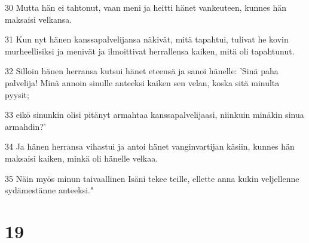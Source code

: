 \par 30 Mutta hän ei tahtonut, vaan meni ja heitti hänet vankeuteen, kunnes hän maksaisi velkansa.
\par 31 Kun nyt hänen kanssapalvelijansa näkivät, mitä tapahtui, tulivat he kovin murheellisiksi ja menivät ja ilmoittivat herrallensa kaiken, mitä oli tapahtunut.
\par 32 Silloin hänen herransa kutsui hänet eteensä ja sanoi hänelle: 'Sinä paha palvelija! Minä annoin sinulle anteeksi kaiken sen velan, koska sitä minulta pyysit;
\par 33 eikö sinunkin olisi pitänyt armahtaa kanssapalvelijaasi, niinkuin minäkin sinua armahdin?'
\par 34 Ja hänen herransa vihastui ja antoi hänet vanginvartijan käsiin, kunnes hän maksaisi kaiken, minkä oli hänelle velkaa.
\par 35 Näin myös minun taivaallinen Isäni tekee teille, ellette anna kukin veljellenne sydämestänne anteeksi."

\chapter{19}

